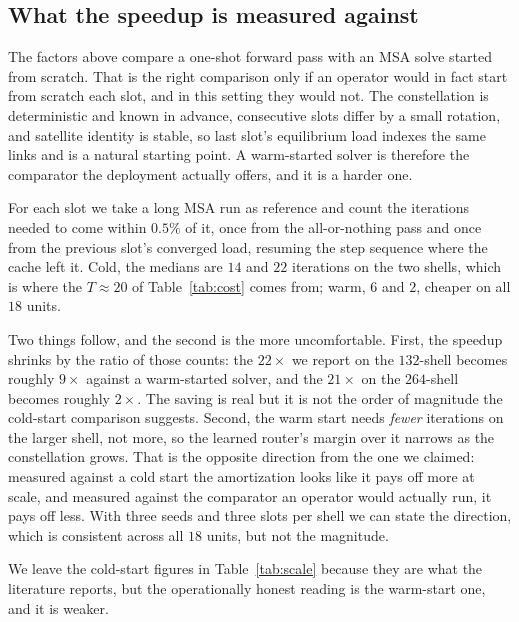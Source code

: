 \documentclass[journal]{IEEEtran}
\begin{document}
\subsection{What the speedup is measured against}\label{sec:warmstart}
The factors above compare a one-shot forward pass with an MSA solve started from scratch. That is
the right comparison only if an operator would in fact start from scratch each slot, and in this
setting they would not. The constellation is deterministic and known in advance, consecutive slots
differ by a small rotation, and satellite identity is stable, so last slot's equilibrium load
indexes the same links and is a natural starting point. A warm-started solver is therefore the
comparator the deployment actually offers, and it is a harder one.

For each slot we take a long MSA run as reference and count the iterations needed to come within $0.5\%$ of it, once from the all-or-nothing pass and once from the previous slot's converged load, resuming the step sequence where the cache left it. Cold, the medians are $14$ and $22$ iterations on the two shells, which is where the $T\approx 20$ of Table~\ref{tab:cost} comes from; warm, $6$ and $2$, cheaper on all $18$ units.

Two things follow, and the second is the more uncomfortable. First, the speedup shrinks by the
ratio of those counts: the $22\times$ we report on the $132$-shell becomes roughly $9\times$
against a warm-started solver, and the $21\times$ on the $264$-shell becomes roughly $2\times$.
The saving is real but it is not the order of magnitude the cold-start comparison suggests.
Second, the warm start needs \emph{fewer} iterations on the larger shell, not more, so the learned
router's margin over it narrows as the constellation grows. That is the opposite direction from the
one we claimed: measured against a cold start the amortization looks like it pays off more at
scale, and measured against the comparator an operator would actually run, it pays off less. With
three seeds and three slots per shell we can state the direction, which is consistent across all
$18$ units, but not the magnitude.

We leave the cold-start figures in Table~\ref{tab:scale} because they are what the literature reports, but the operationally honest reading is the warm-start one, and it is weaker.
\end{document}
